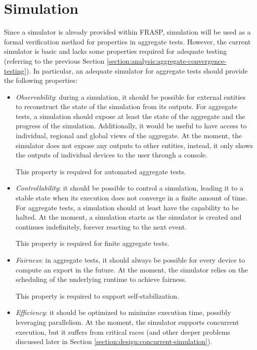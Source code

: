 
\section{Simulation}
\label{section:analysis:simulation}

Since a simulator is already provided within FRASP, simulation will be used as
a formal verification method for properties in aggregate tests. However, the
current simulator is basic and lacks some properties required for adequate
testing (referring to the previous Section
\ref{section:analysis:aggregate-convergence-testing}). In particular, an
adequate simulator for aggregate tests should provide the following properties:
\begin{itemize}
  \item \textit{Observability}: during a simulation, it should be possible for
        external entities to reconstruct the state of the simulation from its
        outputs. For aggregate tests, a simulation should expose at least the
        state of the aggregate and the progress of the simulation. Additionally,
        it would be useful to have access to individual, regional and global
        views of the aggregate. At the moment, the simulator does not expose
        any outputs to other entities, instead, it only shows the outputs of
        individual devices to the user through a console.

        This property is required for automated aggregate tests.
  \item \textit{Controllability}: it should be possible to control a
        simulation, leading it to a stable state when its execution does not
        converge in a finite amount of time. For aggregate tests, a simulation
        should at least have the capability to be halted. At the moment, a
        simulation starts as the simulator is created and continues
        indefinitely, forever reacting to the next event.

        This property is required for finite aggregate tests.
  \item \textit{Fairness}: in aggregate tests, it should always be possible for
        every device to compute an export in the future. At the moment, the
        simulator relies on the scheduling of the underlying runtime to achieve
        fairness.

        This property is required to support self-stabilization.
  \item \textit{Efficiency}: it should be optimized to minimize execution time,
        possibly leveraging parallelism. At the moment, the simulator supports
        concurrent execution, but it suffers from critical races (and other
        deeper problems discussed later in Section
        \ref{section:design:concurrent-simulation}).


\end{itemize}
